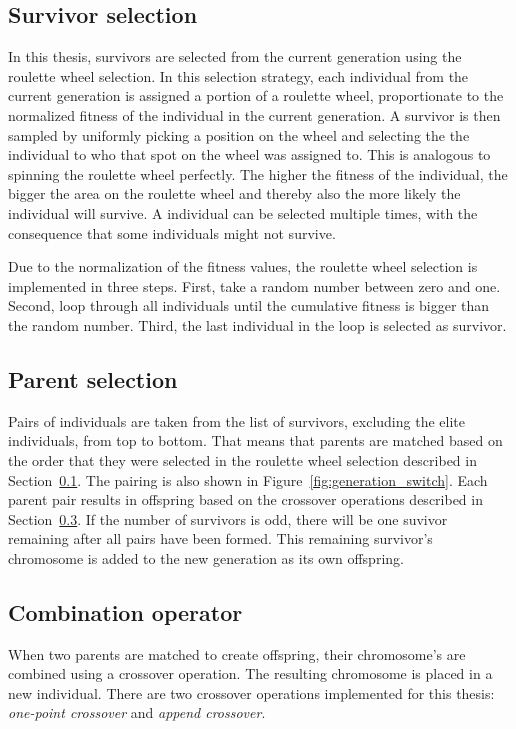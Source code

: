 \subsection{Survivor selection}
\label{sec:approach_survivor_selection}
In this thesis, survivors are selected from the current generation using the
roulette wheel selection. In this selection strategy, each individual from the
current generation is assigned a portion of a roulette wheel, proportionate to
the normalized fitness of the individual in the current generation. A survivor
is then sampled by uniformly picking a position on the wheel and selecting the
the individual to who that spot on the wheel was assigned to. This is analogous
to spinning the roulette wheel perfectly. The higher the fitness of the
individual, the bigger the area on the roulette wheel and thereby also the more
likely the individual will survive. A individual can be selected multiple
times, with the consequence that some individuals might not survive.

Due to the normalization of the fitness values, the roulette wheel selection
is implemented in three steps. First, take a random number between zero and one.
Second, loop through all individuals until the cumulative fitness is bigger
than the random number. Third, the last individual in the loop is selected as
survivor.

\subsection{Parent selection}
\label{sec:approach_parent_selection}
Pairs of individuals are taken from the list of survivors, excluding the elite
individuals, from top to bottom. That means that parents are matched based on
the order that they were selected in the roulette wheel selection described in
Section~\ref{sec:approach_survivor_selection}. The pairing is also shown in
Figure~\ref{fig:generation_switch}. Each parent pair results in offspring
based on the crossover operations described in
Section~\ref{sec:approach_combination_operator}. If the number of survivors is
odd, there will be one suvivor remaining after all pairs have been formed.
This remaining survivor's chromosome is added to the new generation
as its own offspring.

\subsection{Combination operator}
\label{sec:approach_combination_operator}
When two parents are matched to create offspring, their chromosome's are
combined using a crossover operation. The resulting chromosome is placed in a
new individual. There are two crossover operations implemented for this thesis:
\emph{one-point crossover} and \emph{append crossover}.

